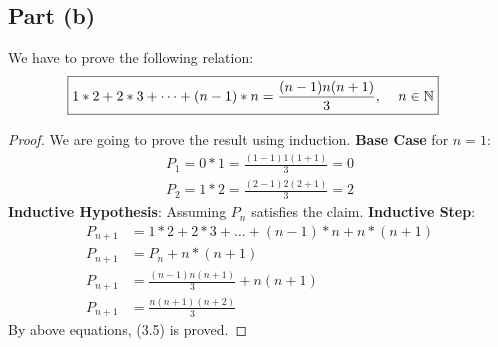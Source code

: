 \documentclass{article}
\begin{document}
{  \subsection{Part (b)}{
    We have to prove the following relation:
    \begin{align}
      \Aboxed{1*2+2*3+\dots+(n-1)*n=\frac{(n-1)n(n+1)}{3} ,\, \quad n \in \mathbb{N}} \label{eq:4}
    \end{align}
    \begin{proof}
      We are going to prove the result using induction. \newline
      \textbf{Base Case} for $n=1$:
      \begin{align*}
        P_1=0*1=\frac{(1-1)1(1+1)}{3}=0 \\
        P_2=1*2=\frac{(2-1)2(2+1)}{3}=2
      \end{align*}
      \textbf{Inductive Hypothesis}: Assuming $P_n$ satisfies the claim. \newline
      \textbf{Inductive Step}:
      \begin{align*}
        P_{n+1}&=1*2+2*3+\dots+(n-1)*n+n*(n+1) \\
        P_{n+1}&=P_n+n*(n+1) \\ 
        P_{n+1}&=\frac{(n-1)n(n+1)}{3}+n(n+1) \\
        P_{n+1}&=\frac{n(n+1)(n+2)}{3}
      \end{align*}
      By above equations, (3.5) is proved.
    \end{proof}
  }
}
\end{document}

